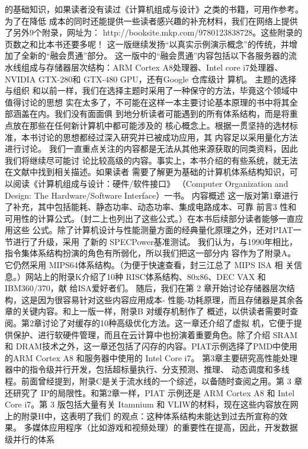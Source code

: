 的基础知识，如果读者没有读过《计算机组成与设计》之类的书籍，可用作参考。为了在降低
成本的同时还能提供一些读者感兴趣的补充材料，我们在网络上提供了另外9个附录，网址为：
http://booksite.mkp.com/9780123838728。这些附录的页数之和比本书还要多呢！
这一版继续发扬“以真实示例演示概念”的传统，并增加了全新的“融会贯通”部分。
这一版中的“融会贯通”内容包括以下各服务器的流水线组成与存储器层次结构：ARM Cortex
A8处理器、Intel core i7处理器、NVIDIA GTX-280和 GTX-480 GPU，还有Google 仓库级计
算机。
主题的选择与组织
和以前一样，我们在选择主题时采用了一种保守的方法，毕竟这个领域中值得讨论的思想
实在太多了，不可能在这样一本主要讨论基本原理的书中将其全部涵盖在内。我们没有面面俱
到地分析读者可能遇到的所有体系结构，而是将重点放在那些在任何新计算机中都可能涉及的
核心概念上。根据一贯坚持的选材标准，本书讨论的思想都经过深入研究并已被成功应用，其
内容足以采用量化方法进行讨论。
我们一直重点关注的内容都是无法从其他来源获取的同类资料，因此我们将继续尽可能讨
论比较高级的内容。事实上，本书介绍的有些系统，就无法在文献中找到相关描述。如果读者
需要了解更为基础的计算机体系结构知识，可以阅读《计算机组成与设计：硬件/软件接口》
（Computer Organization and Design: The Hardware/Software Interface）一书。
内容概述
这一版对第1章进行了补充，其中包括能耗、静态功率、动态功率、集成电路成本、可靠
前言3
性和可用性的计算公式。（封二上也列出了这些公式。）在本书后续部分读者能够一直应用这些
公式。除了计算机设计与性能测量方面的经典量化原理之外，还对PIAT一节进行了升级，采用
了新的 SPECPower基准测试。
我们认为，与1990年相比，指令集体系结构扮演的角色有所弱化，所以我们把这一部分内
容作为了附录A。它仍然采用 MIPS64体系结构。（为便于快速查看，封三江总了 MIPS ISA 相
关信息。）网站上的附录K介绍了10种 RISC体系结构、80x86、DEC VAX 和 IBM360/370，献
给ISA爱好者们。
随后，我们在第 2 章开始讨论存储器层次结构，这是因为很容易针对这些内容应用成本-
性能-功耗原理，而且存储器是其余各章的关键内容。和上一版一样，附录B 对缓存机制作了
概述，以供读者需要时查阅。第2章讨论了对缓存的10种高级优化方法。这一章还介绍了虚拟
机，它便于提供保护、进行软硬件管理，而且在云计算中也扮演着重要角色。除了介绍 SRAM
和 DRAM技术之外，这一章还包括了闪存的内容。PIAT示例选择了PMD中使用的ARM Cortex
A8 和服务器中使用的 Intel Core i7。
第3章主要研究高性能处理器中的指令级并行开发，包括超标量执行、分支预测、推理、
动态调度和多线程。前面曾经提到，附录C是关于流水线的一个综述，以备随时查阅之用。第
3 章还研究了 IP的局限性。和第2章一样，PIAT 示例还是 ARM Cortex A8 和 Intel Core i7。第
3 版包括大量有关 Itamnium 和 VLIW的材料，现在这些内容放在网上的附录H中，这表明了我们
的观点：这种体系结构未能达到过去所宣称的效果。
多媒体应用程序（比如游戏和视频处理）的重要性在提高，因此，开发数据级并行的体系
